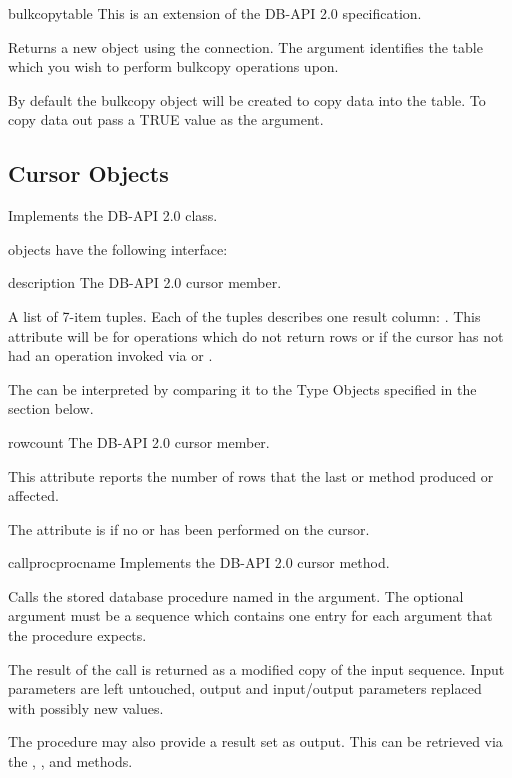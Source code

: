 \begin{methoddesc}[Connection]{bulkcopy}{table }
This is an extension of the DB-API 2.0 specification.

Returns a new  object using the connection.  The
 argument identifies the table which you wish to perform
bulkcopy operations upon.

By default the bulkcopy object will be created to copy data into the
table.  To copy data out pass a TRUE value as the 
argument.
\end{methoddesc}

\subsection{Cursor Objects}

Implements the DB-API 2.0  class.

 objects have the following interface:

\begin{memberdesc}[Cursor]{description}
The DB-API 2.0 cursor  member.

A list of 7-item tuples.  Each of the tuples describes one result
column: .  This attribute will be  for
operations which do not return rows or if the cursor has not had an
operation invoked via  or .

The  can be interpreted by comparing it to the Type
Objects specified in the section below.
\end{memberdesc}

\begin{memberdesc}[Cursor]{rowcount}
The DB-API 2.0 cursor  member.

This attribute reports the number of rows that the last
 or  method produced or
affected.

The attribute is  if no  or
 has been performed on the cursor.
\end{memberdesc}

\begin{methoddesc}[Cursor]{callproc}{procname }
Implements the DB-API 2.0 cursor  method.

Calls the stored database procedure named in the 
argument. The optional  argument must be a sequence
which contains one entry for each argument that the procedure expects.

The result of the call is returned as a modified copy of the input
sequence.  Input parameters are left untouched, output and
input/output parameters replaced with possibly new values.

The procedure may also provide a result set as output. This can be
retrieved via the , , and
 methods.
\end{methoddesc}

